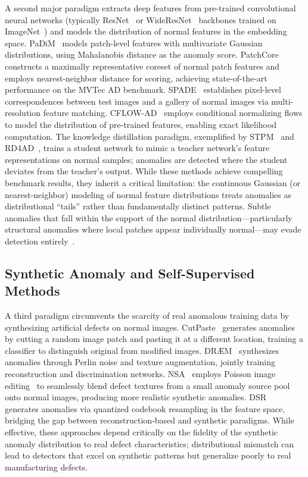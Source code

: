\documentclass[lettersize,journal]{IEEEtran}
\begin{document}
A second major paradigm extracts deep features from pre-trained convolutional neural networks (typically ResNet~\cite{he2016resnet} or WideResNet~\cite{zagoruyko2016wideresnet} backbones trained on ImageNet~\cite{deng2009imagenet}) and models the distribution of normal features in the embedding space. PaDiM~\cite{defard2021padim} models patch-level features with multivariate Gaussian distributions, using Mahalanobis distance as the anomaly score. PatchCore~\cite{roth2022patchcore} constructs a maximally representative coreset of normal patch features and employs nearest-neighbor distance for scoring, achieving state-of-the-art performance on the MVTec AD benchmark. SPADE~\cite{cohen2020spade} establishes pixel-level correspondences between test images and a gallery of normal images via multi-resolution feature matching. CFLOW-AD~\cite{gudovskiy2022cflow} employs conditional normalizing flows to model the distribution of pre-trained features, enabling exact likelihood computation. The knowledge distillation paradigm, exemplified by STPM~\cite{wang2021stpm} and RD4AD~\cite{deng2022reverse}, trains a student network to mimic a teacher network's feature representations on normal samples; anomalies are detected where the student deviates from the teacher's output. While these methods achieve compelling benchmark results, they inherit a critical limitation: the continuous Gaussian (or nearest-neighbor) modeling of normal feature distributions treats anomalies as distributional ``tails'' rather than fundamentally distinct patterns. Subtle anomalies that fall within the support of the normal distribution---particularly structural anomalies where local patches appear individually normal---may evade detection entirely~\cite{rippel2020modeling}.

\subsection{Synthetic Anomaly and Self-Supervised Methods}

A third paradigm circumvents the scarcity of real anomalous training data by synthesizing artificial defects on normal images. CutPaste~\cite{li2021cutpaste} generates anomalies by cutting a random image patch and pasting it at a different location, training a classifier to distinguish original from modified images. DR\AE M~\cite{zavrtanik2021drae} synthesizes anomalies through Perlin noise and texture augmentation, jointly training reconstruction and discrimination networks. NSA~\cite{schluter2022nsa} employs Poisson image editing~\cite{perez2003poisson} to seamlessly blend defect textures from a small anomaly source pool onto normal images, producing more realistic synthetic anomalies. DSR~\cite{zavrtanik2022dsr} generates anomalies via quantized codebook resampling in the feature space, bridging the gap between reconstruction-based and synthetic paradigms. While effective, these approaches depend critically on the fidelity of the synthetic anomaly distribution to real defect characteristics; distributional mismatch can lead to detectors that excel on synthetic patterns but generalize poorly to real manufacturing defects.
\end{document}
